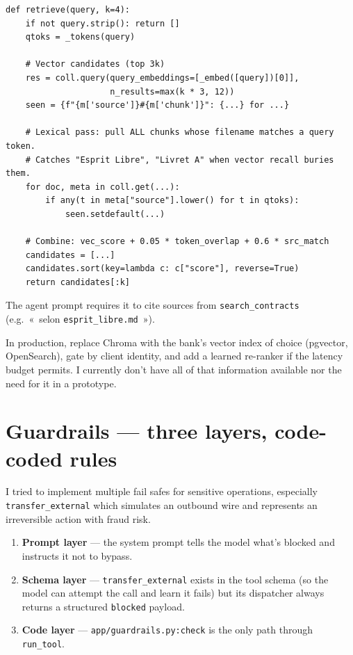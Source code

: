 \documentclass[11pt]{article}
\begin{document}
\begin{lstlisting}[style=py]
def retrieve(query, k=4):
    if not query.strip(): return []
    qtoks = _tokens(query)

    # Vector candidates (top 3k)
    res = coll.query(query_embeddings=[_embed([query])[0]],
                     n_results=max(k * 3, 12))
    seen = {f"{m['source']}#{m['chunk']}": {...} for ...}

    # Lexical pass: pull ALL chunks whose filename matches a query token.
    # Catches "Esprit Libre", "Livret A" when vector recall buries them.
    for doc, meta in coll.get(...):
        if any(t in meta["source"].lower() for t in qtoks):
            seen.setdefault(...)

    # Combine: vec_score + 0.05 * token_overlap + 0.6 * src_match
    candidates = [...]
    candidates.sort(key=lambda c: c["score"], reverse=True)
    return candidates[:k]
\end{lstlisting}

The agent prompt requires it to cite sources from \texttt{search\_contracts} (e.g.\ «~selon \texttt{esprit\_libre.md}~»).

In production, replace Chroma with the bank's vector index of choice (pgvector, OpenSearch), gate by client identity, and add a learned re-ranker if the latency budget permits. I currently don't have all of that information available nor the need for it in a prototype.

\section{Guardrails --- three layers, code-coded rules}

I tried to implement multiple fail safes for sensitive operations, especially \texttt{transfer\_external} which simulates an outbound wire and represents an irreversible action with fraud risk.

\begin{enumerate}[leftmargin=*]
  \item \textbf{Prompt layer} --- the system prompt tells the model what's blocked and instructs it not to bypass.
  \item \textbf{Schema layer} --- \texttt{transfer\_external} exists in the tool schema (so the model can attempt the call and learn it fails) but its dispatcher always returns a structured \texttt{blocked} payload.
  \item \textbf{Code layer} --- \texttt{app/guardrails.py:check} is the only path through \texttt{run\_tool}.
\end{enumerate}
\end{document}
